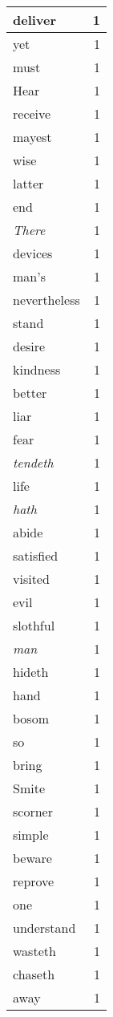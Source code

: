 \begin{center}
\begin{longtable}{l|r}
deliver & 1\\ \hline 
yet & 1\\ \hline 
must & 1\\ \hline 
Hear & 1\\ \hline 
receive & 1\\ \hline 
mayest & 1\\ \hline 
wise & 1\\ \hline 
latter & 1\\ \hline 
end & 1\\ \hline 
\emph{There} & 1\\ \hline 
devices & 1\\ \hline 
man's & 1\\ \hline 
nevertheless & 1\\ \hline 
stand & 1\\ \hline 
desire & 1\\ \hline 
kindness & 1\\ \hline 
better & 1\\ \hline 
liar & 1\\ \hline 
fear & 1\\ \hline 
\emph{tendeth} & 1\\ \hline 
life & 1\\ \hline 
\emph{hath} & 1\\ \hline 
abide & 1\\ \hline 
satisfied & 1\\ \hline 
visited & 1\\ \hline 
evil & 1\\ \hline 
slothful & 1\\ \hline 
\emph{man} & 1\\ \hline 
hideth & 1\\ \hline 
hand & 1\\ \hline 
bosom & 1\\ \hline 
so & 1\\ \hline 
bring & 1\\ \hline 
Smite & 1\\ \hline 
scorner & 1\\ \hline 
simple & 1\\ \hline 
beware & 1\\ \hline 
reprove & 1\\ \hline 
one & 1\\ \hline 
understand & 1\\ \hline 
wasteth & 1\\ \hline 
chaseth & 1\\ \hline 
away & 1\\ \hline 

\end{longtable}
\end{center}
